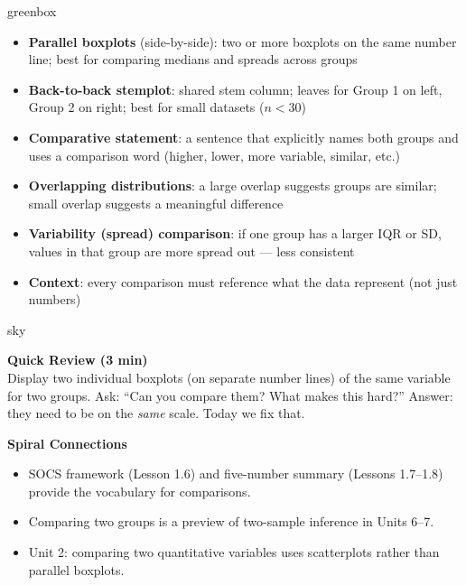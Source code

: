 \documentclass[10pt]{article}
\begin{document}
\begin{skillbox}{greenbox}
\begin{minipage}[t]{0.48\linewidth}
    \begin{itemize}
        \item \textbf{Parallel boxplots} (side-by-side): two or more boxplots on the same number line; best for comparing medians and spreads across groups
        \item \textbf{Back-to-back stemplot}: shared stem column; leaves for Group 1 on left, Group 2 on right; best for small datasets ($n < 30$)
        \item \textbf{Comparative statement}: a sentence that explicitly names both groups and uses a comparison word (higher, lower, more variable, similar, etc.)
    \end{itemize}
\end{minipage}
\hfill
\begin{minipage}[t]{0.48\linewidth}
    \begin{itemize}
        \item \textbf{Overlapping distributions}: a large overlap suggests groups are similar; small overlap suggests a meaningful difference
        \item \textbf{Variability (spread) comparison}: if one group has a larger IQR or SD, values in that group are more spread out --- less consistent
        \item \textbf{Context}: every comparison must reference what the data represent (not just numbers)
    \end{itemize}
\end{minipage}
\end{skillbox}

\begin{skillbox}{sky}
\begin{minipage}[t]{0.48\linewidth}
    \textbf{Quick Review (3 min)}\\
    Display two individual boxplots (on separate number lines) of the same variable for two groups. Ask: ``Can you compare them? What makes this hard?'' Answer: they need to be on the \textit{same} scale. Today we fix that.
\end{minipage}
\hfill
\begin{minipage}[t]{0.48\linewidth}
    \textbf{Spiral Connections}
    \begin{itemize}
        \item SOCS framework (Lesson 1.6) and five-number summary (Lessons 1.7--1.8) provide the vocabulary for comparisons.
        \item Comparing two groups is a preview of two-sample inference in Units 6--7.
        \item Unit 2: comparing two quantitative variables uses scatterplots rather than parallel boxplots.
    \end{itemize}
\end{minipage}
\end{skillbox}
\end{document}
